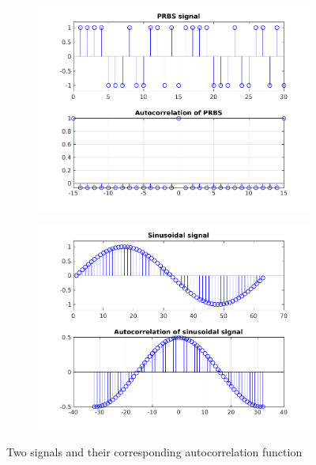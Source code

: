 \documentclass{scrartcl}
\begin{document}
\begin{figure}[h]
	\centering
	\begin{subfigure}{0.45\textwidth}
		\includegraphics[width=\textwidth]{figures/prbs.pdf}
		\label{fig:autocorrPRBS}
	\end{subfigure}
	\begin{subfigure}{0.45\textwidth}
		\includegraphics[width=\textwidth]{figures/sine.pdf}
		\label{fig:autocorrSINUS}
	\end{subfigure}
	\caption{Two signals and their corresponding autocorrelation function}\label{fig:autocorr}
\end{figure}
\end{document}

